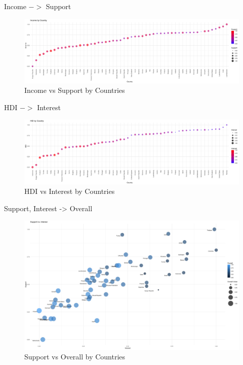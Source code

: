 \documentclass[12pt]{article}
\begin{document}

Income $->$ Support
\begin{figure}[htb]
  \centering
  \includegraphics[width=\linewidth]{images/income_support_by_country}
  \caption{Income vs Support by Countries}
  \label{fig:inc_sup}
\end{figure}

HDI $->$ Interest
\begin{figure}[htb]
  \centering
  \includegraphics[width=\linewidth]{images/hdi_interest_by_country}
  \caption{HDI vs Interest by Countries}
  \label{fig:hdi_int}
\end{figure}

Support, Interest -> Overall

\begin{figure}[htb]
  \centering
  \includegraphics[width=\linewidth]{images/interest_support_vs_overall}
  \caption{Support vs Overall by Countries}
  \label{fig:int_sup_overall}
\end{figure}
\end{document}

